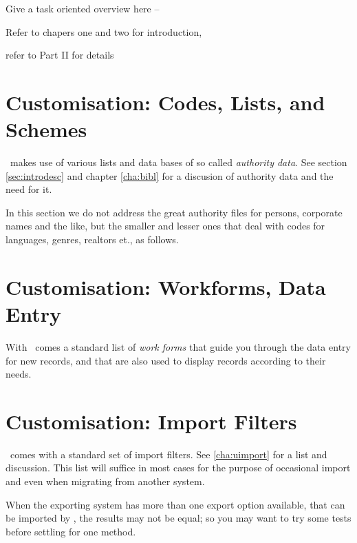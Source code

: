 \begin{dnote}
\item Give a task oriented overview here --
\item Refer to chapers one and two for introduction, 
\item refer to Part II for details
\end{dnote}



\section{Customisation: Codes, Lists, and Schemes}
\label{sec:rginstcodes}

\Pyb\ makes use of various lists and data bases of so called
\textit{authority data}.  See section \ref{sec:introdesc} and chapter
\ref{cha:bibl} for a discusion of authority data and the need for it.

In this section we do not address the great authority files for
persons, corporate names and the like, but the smaller  and lesser
ones that deal with codes for languages, genres, realtors et., as
follows.





\section{Customisation: Workforms, Data Entry}
\label{sec:rginstinput}

With \Pyb\ comes a standard list of \textit{work forms} that guide you
through the data entry for new records, and that are also used to
display records according to their needs. 



\section{Customisation: Import Filters}
\label{sec:rginstimport}

\Pyb\ comes with a standard set of import filters.  See
\ref{cha:uimport} for a list and discussion.   This list will suffice
in most cases for the purpose of occasional import and even when
migrating from another system. 

When the exporting system has more than one export option available,
that can be  imported by \Pyb, the results may not be equal; so you
may want to try some tests before settling for one method.

